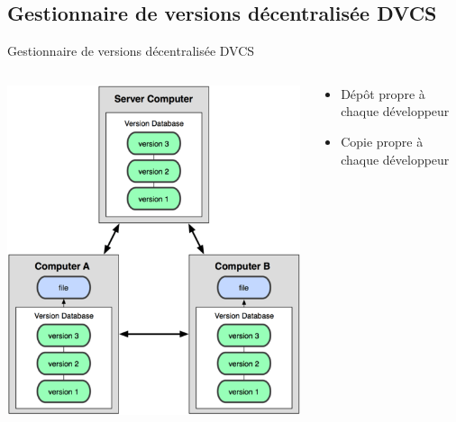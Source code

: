 \subsection{Gestionnaire de versions décentralisée DVCS}
\begin{frame}{Gestionnaire de versions décentralisée DVCS}
  \begin{columns}[T]

    \begin{column}{.6\textwidth}
      \includegraphics[width=\textwidth]{./DVCS.png}
    \end{column}

    \begin{column}{.4\textwidth}
      \begin{itemize}
        \item{Dépôt propre à chaque développeur}
        \item{Copie propre à chaque développeur}
      \end{itemize}
    \end{column}

  \end{columns}
\end{frame}

